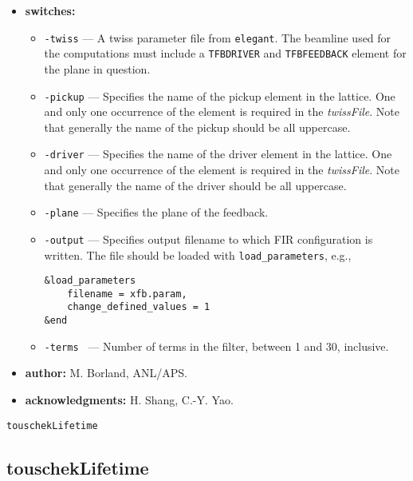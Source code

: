 \documentclass[11pt]{article}
\begin{document}
\begin{itemize}
\item {\bf switches:}
\begin{itemize}
\item {\tt -twiss} --- A twiss parameter file from {\tt elegant}. 
The beamline used for the computations must include a \verb|TFBDRIVER| and
\verb|TFBFEEDBACK| element for the plane in question.
\item {\tt -pickup} --- Specifies the name of the pickup element in the lattice.
  One and only one occurrence of the element is required in the {\em twissFile}.
  Note that generally the name of the pickup should be all uppercase.
\item {\tt -driver} --- Specifies the name of the driver element in the lattice.
  One and only one occurrence of the element is required in the {\em twissFile}.
  Note that generally the name of the driver should be all uppercase.
\item {\tt -plane} --- Specifies the plane of the feedback.
\item {\tt -output} --- Specifies output filename to which FIR configuration is written.
  The file should be loaded with \verb|load_parameters|, e.g.,
\begin{verbatim}
&load_parameters
    filename = xfb.param,
    change_defined_values = 1
&end
\end{verbatim}
\item {\tt -terms } --- Number of terms in the filter, between 1 and 30, inclusive.
\end{itemize}

\item {\bf author:} M. Borland, ANL/APS.

\item {\bf acknowledgments:} H. Shang, C.-Y. Yao.

\end{itemize}


\newpage
\begin{center}{\Large\verb|touschekLifetime|}\end{center}
\subsection{touschekLifetime}
\end{document}
